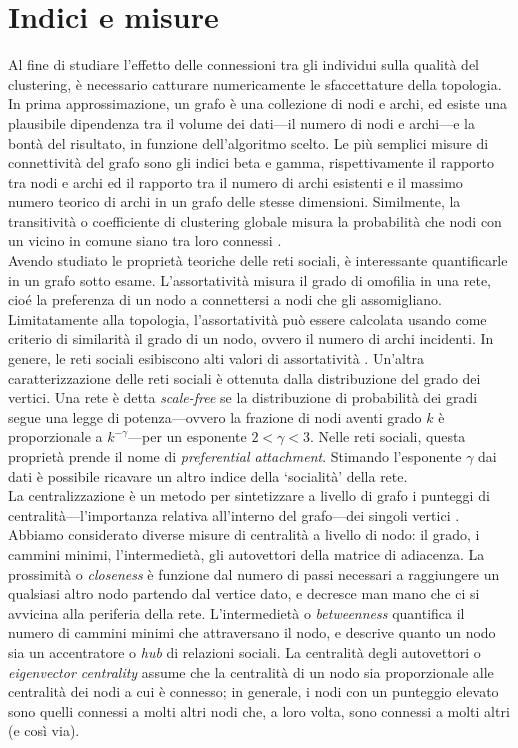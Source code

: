 \section{Indici e misure}
\label{section:indici_e_misure}
Al fine di studiare l'effetto delle connessioni tra gli individui sulla qualit\`a del clustering, \`e necessario catturare numericamente le sfaccettature della topologia. In prima approssimazione, un grafo \`e una collezione di nodi e archi, ed esiste una plausibile dipendenza tra il volume dei dati---il numero di nodi e archi---e la bont\`a del risultato, in funzione dell'algoritmo scelto.
Le pi\`u semplici misure di connettivit\`a del grafo sono gli indici beta e gamma, rispettivamente il rapporto tra nodi e archi ed il rapporto tra il numero di archi esistenti e il massimo numero teorico di archi in un grafo delle stesse dimensioni. Similmente, la transitivit\`a o coefficiente di clustering globale misura la probabilit\`a che nodi con un vicino in comune siano tra loro connessi \cite{wasserman1994social}.\\
Avendo studiato le propriet\`a teoriche delle reti sociali, \`e interessante quantificarle in un grafo sotto esame. L'assortativit\`a misura il grado di omofilia in una rete, cio\'e la preferenza di un nodo a connettersi a nodi che gli assomigliano. Limitatamente alla topologia, l'assortativit\`a pu\`o essere calcolata usando come criterio di similarit\`a il grado di un nodo, ovvero il numero di archi incidenti. In genere, le reti sociali esibiscono alti valori di assortativit\`a \cite{newman03social,newman02}. Un'altra caratterizzazione delle reti sociali \`e ottenuta dalla distribuzione del grado dei vertici. Una rete \`e detta \textit{scale-free} se la distribuzione di probabilit\`a dei gradi segue una legge di potenza---ovvero la frazione di nodi aventi grado $k$ \`e proporzionale a $k^{-\gamma}$---per un esponente $2<\gamma<3$. Nelle reti sociali, questa propriet\`a prende il nome di \textit{preferential attachment}\cite{Barabasi99emergenceScaling}. Stimando l'esponente $\gamma$ dai dati \`e possibile ricavare un altro indice della `socialit\`a' della rete.\\
La centralizzazione \`e un metodo per sintetizzare a livello di grafo i punteggi di centralit\`a---l'importanza relativa all'interno del grafo---dei singoli vertici \cite{freeman1979centrality,wasserman1994social}. Abbiamo considerato diverse misure di centralit\`a a livello di nodo: il grado, i cammini minimi, l'intermediet\`a, gli autovettori della matrice di adiacenza. La prossimit\`a o \textit{closeness} \`e funzione dal numero di passi necessari a raggiungere un qualsiasi altro nodo partendo dal vertice dato, e decresce man mano che ci si avvicina alla periferia della rete. L'intermediet\`a o \textit{betweenness} quantifica il numero di cammini minimi che attraversano il nodo, e descrive quanto un nodo sia un accentratore o \textit{hub} di relazioni sociali. La centralit\`a degli autovettori o \textit{eigenvector centrality} \cite{bonacich1987power} assume che la centralit\`a di un nodo sia proporzionale alle centralit\`a dei nodi a cui \`e connesso; in generale, i nodi con un punteggio elevato sono quelli connessi a molti altri nodi che, a loro volta, sono connessi a molti altri (e cos\`i via).\\
